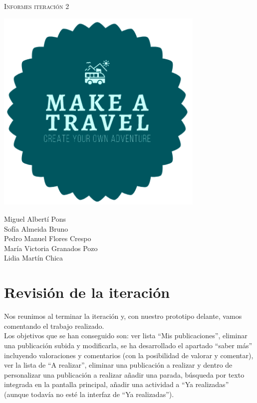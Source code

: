 \documentclass[11pt]{article}
\begin{document}
\begin{titlepage}
\centering
\vspace{4.5cm}
{\scshape\LARGE Informes iteración 2\par}
\vspace{1.5cm}

\includegraphics[width=10cm] {Logo}

\vspace{3cm}
{\scshape\large \par}
\vspace{1cm}

{Miguel Albertí Pons\\
Sofía Almeida Bruno\\
Pedro Manuel Flores Crespo\\
María Victoria Granados Pozo\\
Lidia Martín Chica
\par}

\end{titlepage}

\newpage

\section*{Revisión de la iteración}
Nos reunimos al terminar la iteración y, con nuestro prototipo delante, vamos comentando el trabajo realizado.\\

Los objetivos que se han conseguido son: ver lista ``Mis publicaciones'', eliminar una publicación subida y modificarla, se ha desarrollado el apartado ``saber más'' incluyendo valoraciones y comentarios (con la posibilidad de valorar y comentar), ver la lista de ``A realizar'', eliminar una publicación a realizar y dentro de personalizar una publicación a realizar añadir una parada, búsqueda por texto integrada en la pantalla principal, añadir una actividad a ``Ya realizadas'' (aunque todavía no esté la interfaz de ``Ya realizadas'').\\
\end{document}
